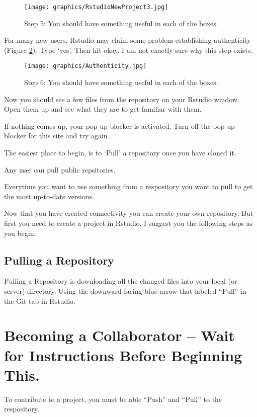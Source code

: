 \documentclass[12pt]{../SOP4_alpha}\usepackage[]{graphicx}\usepackage[]{xcolor}
\begin{document}
\begin{figure}[H]
\centering
\texttt{[image: graphics/RstudioNewProject3.jpg]}
\caption{Step 5: You should have something useful in each of the boxes.}
\label{fig:step5}
\end{figure}

\NP For many new users, Rstudio may claim some problem establishing authenticity (Figure \ref{fig:step6}). Type `yes'. Then hit okay. I am not exactly sure why this step exists. 

\begin{figure}[H]
\centering
\texttt{[image: graphics/Authenticity.jpg]}
\caption{Step 6: You should have something useful in each of the boxes.}
\label{fig:step6}
\end{figure}


\NP Now you should see a few files from the repository on your Rstudio window. Open them up and see what they are to get familiar with them.

\NP If nothing comes up, your pop-up blocker is activated. Turn off the pop-up blocker for this site and try again. 

\NP The easiest place to begin, is to `Pull' a repository once you have cloned it. 

\NP Any user can pull public repsitories. 

\NP Everytime you want to use something from a respository you want to pull to get the most up-to-date versions. 

\NP Now that you have created connectivity you can create your own repository. But first you need to create a project in Rstudio. I suggest you the following steps as you begin:


\subsection{Pulling a Repository}

\NP Pulling a Repository is downloading all the changed files into your local (or server) directory. Using the downward facing blue arrow that labeled ``Pull'' in the Git tab in Rstudio.

\section{Becoming a Collaborator -- Wait for Instructions Before Beginning This.}

\NP To contribute to a project, you must be able ``Push'' and ``Pull'' to the respository. 
\end{document}
